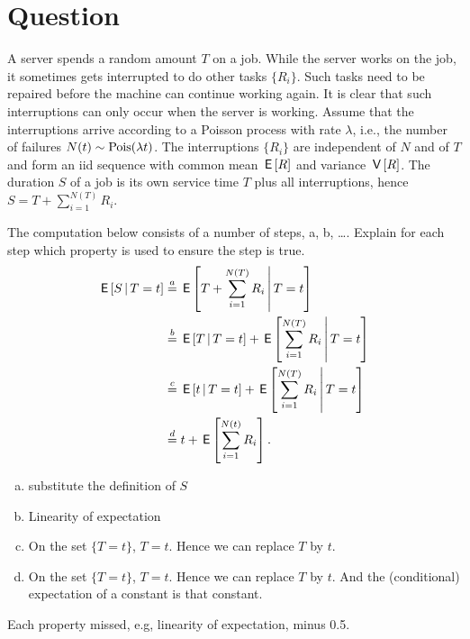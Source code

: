 \section{Question}


A server spends a random amount $T$ on a job.
While the server works on the job, it sometimes gets interrupted to do other tasks $\{R_{i}\}$.
Such tasks need to be repaired before the machine can continue working again.
It is clear that such interruptions can only occur when the server is working.
Assume that the interruptions arrive according to a Poisson process with rate $\lambda$, i.e., the number of failures $N(t) \sim\mathrm{Pois}(\lambda t)$.
The interruptions $\{R_{i}\}$ are independent of $N$ and of $T$ and form an iid sequence with common mean $\,\mathsf{E}\left[R\right]$ and variance $\,\mathsf{V}\left[R\right]$.
The  duration $S$ of a job  is its own service time $T$ plus all interruptions, hence $S = T+ \sum_{i=1}^{N(T)} R_{i}$.

\begin{exercise}[1.5]
The computation below consists of a number of steps, a, b, \ldots. Explain for each step which property is used to ensure the step is true.
\begin{align}
\,\mathsf{E}\left[S\,\middle|\, T = t\right]
  &\stackrel{a}{=} \,\mathsf{E}\left[T + \sum_{i=1}^{N(T)} R_{i}\,\middle|\, T=t\right] \\
  &\stackrel{b}{=} \,\mathsf{E}\left[T\,\middle|\, T=t\right] + \,\mathsf{E}\left[\sum_{i=1}^{N(T)} R_{i}\,\middle|\, T=t\right] \\
  &\stackrel{c}{=} \,\mathsf{E}\left[t \,\middle|\, T=t\right] + \,\mathsf{E}\left[\sum_{i=1}^{N(T)} R_{i}\,\middle|\, T=t\right] \\
  &\stackrel{d}{=} t + \,\mathsf{E}\left[\sum_{i=1}^{N(t)} R_{i}\right].
\end{align}
\begin{solution}
  \begin{enumerate}[a.]
  \item  substitute the definition of $S$
  \item  Linearity of expectation
  \item  On the set $\{T=t\}$, $T=t$. Hence we can replace  $T$ by $t$.
  \item  On the set $\{T=t\}$, $T=t$. Hence we can replace  $T$ by $t$. And the (conditional) expectation of a constant is that constant.
  \end{enumerate}
Each  property missed, e.g, linearity of expectation, minus 0.5.
\end{solution}
\end{exercise}

